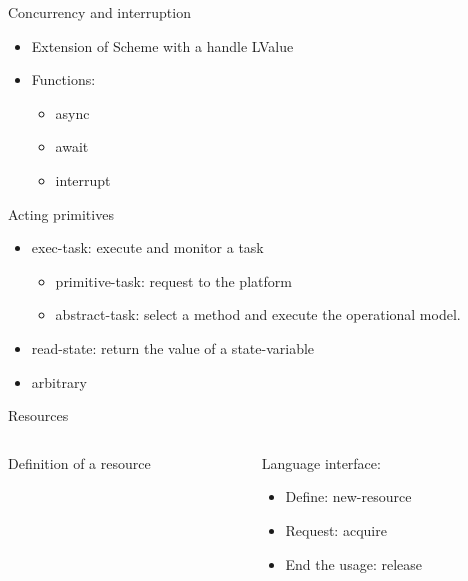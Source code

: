 \begin{frame}{Concurrency and interruption}
    \begin{itemize}
        \item Extension of Scheme with a handle LValue
        \item Functions:
        \begin{itemize}
            \item async
            \item await
            \item interrupt
        \end{itemize}
    \end{itemize}
\end{frame}

\begin{frame}{Acting primitives}
    \begin{itemize}
    \pause
        \item exec-task: execute and monitor a task
    \pause
        \begin{itemize}
            \item primitive-task: request to the platform
            \item abstract-task: select a method and execute the operational model.
        \end{itemize}
    \pause
        \item read-state: return the value of a state-variable
        \item arbitrary
    \end{itemize}
\end{frame}

\begin{frame}{Resources}
    \begin{columns}
        \begin{column}{0.5\textwidth}
            Definition of a resource
        \end{column}
        \begin{column}{0.5\textwidth}
            Language interface:
            \begin{itemize}
                \item Define: new-resource
                \item Request: acquire
                \item End the usage: release
            \end{itemize}
        \end{column}
    \end{columns}
\end{frame}

